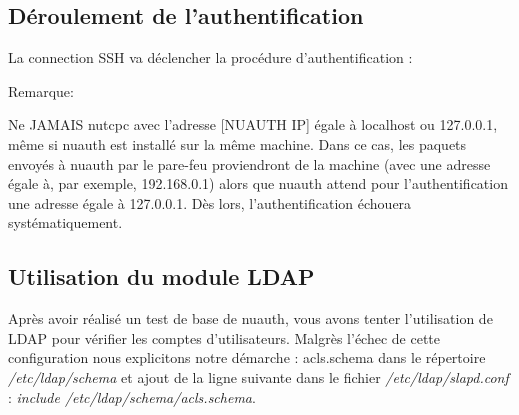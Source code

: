 \documentclass[12pt]{report}
\begin{document}
\begin{itemize}
\subsection{Déroulement de l'authentification}
La connection SSH va déclencher la procédure d’authentification :

Remarque:

Ne JAMAIS nutcpc avec l’adresse [NUAUTH IP] égale à localhost ou 127.0.0.1, même si nuauth 
est installé sur la même machine. Dans ce cas, les paquets envoyés à nuauth 
par le pare-feu proviendront de la machine (avec une adresse égale à, par exemple,
192.168.0.1) alors que nuauth attend pour l’authentification une adresse égale à 127.0.0.1. 
Dès lors, l’authentification échouera systématiquement.

\subsection{Utilisation du module LDAP}
Après avoir réalisé un test de base de nuauth, vous avons tenter l'utilisation de LDAP pour vérifier les comptes d'utilisateurs. Malgrès l'échec 
de cette configuration nous explicitons notre démarche : 
acls.schema dans le répertoire \textit{/etc/ldap/schema} et ajout de la ligne suivante dans le fichier \textit{/etc/ldap/slapd.conf} : 
\textit{include  /etc/ldap/schema/acls.schema}.


\end{itemize}
\end{document}

